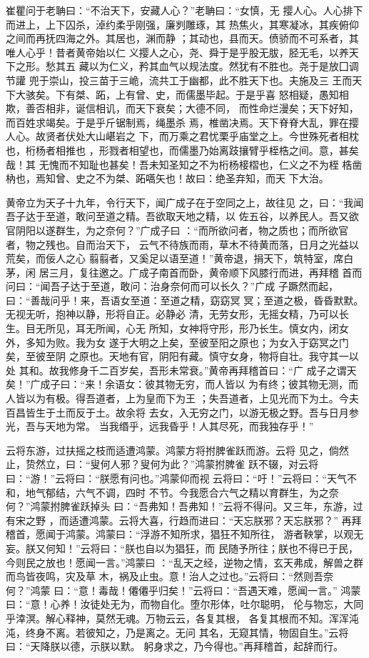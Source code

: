 \documentclass[]{article}
\begin{document}
崔瞿问于老聃曰：``不治天下，安藏人心？''老聃曰：``女慎，无
撄人心。人心排下而进上，上下囚杀，淖约柔乎刚强，廉刿雕琢，其
热焦火，其寒凝冰，其疾俯仰之间而再抚四海之外。其居也，渊而静
；其动也，县而天。偾骄而不可系者，其唯人心乎！昔者黄帝始以仁
义撄人之心，尧、舜于是乎股无胈，胫无毛，以养天下之形。愁其五
藏以为仁义，矜其血气以规法度。然犹有不胜也。尧于是放囗调节讙
兜于崇山，投三苗于三峗，流共工于幽都，此不胜天下也。夫施及三
王而天下大骇矣。下有桀、跖，上有曾、史，而儒墨毕起。于是乎喜
怒相疑，愚知相欺，善否相非，诞信相讥，而天下衰矣；大德不同，
而性命烂漫矣；天下好知，而百姓求竭矣。于是乎斤锯制焉，绳墨杀
焉，椎凿决焉。天下脊脊大乱，罪在撄人心。故贤者伏处大山嵁岩之
下，而万乘之君忧栗乎庙堂之上。今世殊死者相枕也，桁杨者相推也
，形戮者相望也，而儒墨乃始离跂攘臂乎桎梏之间。意，甚矣哉！其
无愧而不知耻也甚矣！吾未知圣知之不为桁杨椄槢也，仁义之不为桎
梏凿枘也，焉知曾、史之不为桀、跖嚆矢也！故曰：绝圣弃知，而天 下大治。

黄帝立为天子十九年，令行天下，闻广成子在于空同之上，故往见
之，曰：``我闻吾子达于至道，敢问至道之精。吾欲取天地之精，以
佐五谷，以养民人。吾又欲官阴阳以遂群生，为之奈何？''广成子曰
：``而所欲问者，物之质也；而所欲官者，物之残也。自而治天下，
云气不待族而雨，草木不待黄而落，日月之光益以荒矣，而佞人之心
翦翦者，又奚足以语至道！''黄帝退，捐天下，筑特室，席白茅，闲
居三月，复往邀之。广成子南首而卧，黄帝顺下风膝行而进，再拜稽
首而问曰：``闻吾子达于至道，敢问：治身奈何而可以长久？''广成
子蹶然而起，曰：``善哉问乎！来，吾语女至道：至道之精，窈窈冥
冥；至道之极，昏昏默默。无视无听，抱神以静，形将自正。必静必
清，无劳女形，无摇女精，乃可以长生。目无所见，耳无所闻，心无
所知，女神将守形，形乃长生。慎女内，闭女外，多知为败。我为女
遂于大明之上矣，至彼至阳之原也；为女入于窈冥之门矣，至彼至阴
之原也。天地有官，阴阳有藏。慎守女身，物将自壮。我守其一以处
其和。故我修身千二百岁矣，吾形未常衰。''黄帝再拜稽首曰：``广
成子之谓天矣！''广成子曰：``来！余语女：彼其物无穷，而人皆以
为有终；彼其物无测，而人皆以为有极。得吾道者，上为皇而下为王
；失吾道者，上见光而下为土。今夫百昌皆生于土而反于土。故余将
去女，入无穷之门，以游无极之野。吾与日月参光，吾与天地为常。
当我缗乎，远我昏乎！人其尽死，而我独存乎！''

云将东游，过扶摇之枝而适遭鸿蒙。鸿蒙方将拊脾雀跃而游。云将
见之，倘然止，贽然立，曰：``叟何人邪？叟何为此？''鸿蒙拊脾雀
跃不辍，对云将曰：``游！''云将曰：``朕愿有问也。''鸿蒙仰而视
云将曰：``吁！''云将曰：``天气不和，地气郁结，六气不调，四时
不节。今我愿合六气之精以育群生，为之奈何？''鸿蒙拊脾雀跃掉头
曰：``吾弗知！吾弗知！''云将不得问。又三年，东游，过有宋之野
，而适遭鸿蒙。云将大喜，行趋而进曰：``天忘朕邪？天忘朕邪？''
再拜稽首，愿闻于鸿蒙。鸿蒙曰：``浮游不知所求，猖狂不知所往，
游者鞅掌，以观无妄。朕又何知！''云将曰：``朕也自以为猖狂，而
民随予所往；朕也不得已于民，今则民之放也！愿闻一言。''鸿蒙曰
：``乱天之经，逆物之情，玄天弗成，解兽之群而鸟皆夜鸣，灾及草
木，祸及止虫。意！治人之过也。''云将曰：``然则吾奈何？''鸿蒙
曰：``意！毒哉！僊僊乎归矣！''云将曰：``吾遇天难，愿闻一言。''
鸿蒙曰：``意！心养！汝徒处无为，而物自化。堕尔形体，吐尔聪明，
伦与物忘，大同乎涬溟。解心释神，莫然无魂。万物云云，各复其根，
各复其根而不知。浑浑沌沌，终身不离。若彼知之，乃是离之。无问
其名，无窥其情，物固自生。''云将曰：``天降朕以德，示朕以默。
躬身求之，乃今得也。''再拜稽首，起辞而行。
\end{document}
